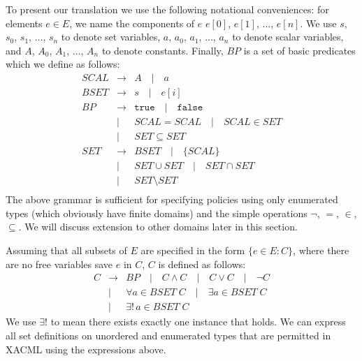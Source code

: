 To present our translation we use the following notational conveniences: for
elements $e \in E$, we name the components of $e$ $e[0]$, $e[1]$, $\dots$,
$e[n]$.  We use $s$, $s_0$, $s_1$, $\dots$, $s_n$ to denote set variables, 
$a$, $a_0$, $a_1$, $\dots$, $a_n$ to denote scalar variables, and $A$, $A_0$, $A_1$,
$\dots$, $A_n$ to denote constants.  Finally, $BP$ is a set of basic
predicates which we define as follows:
\begin{eqnarray*}
  SCAL & \rightarrow & A \quad | \quad a \\
  BSET & \rightarrow & s \quad | \quad e[i] \\
  BP & \rightarrow &  \texttt{true} \quad | \quad \texttt{false}  \\
 & | & SCAL = SCAL \quad | \quad SCAL \in SET  \\
 & | &  SET \subseteq SET \\
  SET & \rightarrow & BSET  \quad | \quad \{ SCAL \} \\
  & | & SET \cup SET \quad | \quad SET \cap SET  \\
  & | &  SET \setminus SET \\
\end{eqnarray*}
The above grammar is sufficient for specifying policies 
using only enumerated types (which
obviously have finite domains) and the simple operations $\neg$, $=$,
$\in$, $\subseteq$.
We will discuss extension to other domains later in this section.

Assuming that all subsets of $E$ are specified in the form $\{ e
\in E : C \}$, where there are no free variables save $e$ in $C$,
$C$ is defined as follows:
\begin{eqnarray*}
  C & \rightarrow & BP \quad | 
      \quad C \wedge C \quad | \quad C \vee C \quad | \quad \neg C \\
 & | &   \forall a \in BSET \; C \quad |
  \quad \exists a \in BSET \; C  \\
  & | & \exists ! \, a \in BSET \; C \quad 
\end{eqnarray*}
We use $\exists !$ to mean there exists exactly one instance that
holds.
We can express all set definitions on unordered and enumerated types
that are permitted in XACML using the expressions above.

